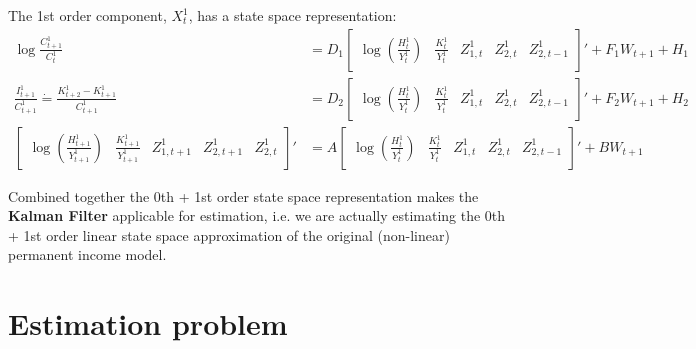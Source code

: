 \documentclass[12pt]{article}
\theoremstyle{definition}
\theoremstyle{remark}
\begin{document}
The 1st order component, $X_t^1$, has a state space representation:
\begin{align*}
    \log\frac{C_{t+1}^1}{C_{t}^1} &= D_1 \begin{bmatrix}\log\left(\frac{H_{t}^1}{Y_{t}^1}\right) & \frac{K_{t}^1}{Y_{t}^1} & Z_{1,t}^1 & Z_{2,t}^1 & Z_{2,t-1}^1 \end{bmatrix}' + F_1 W_{t+1} + H_1 \\
    \frac{I_{t+1}^1}{C_{t+1}^1}\dot{=}\frac{K_{t+2}^1-K_{t+1}^1}{C_{t+1}^1} &= D_2 \begin{bmatrix}\log\left(\frac{H_{t}^1}{Y_{t}^1}\right) & \frac{K_{t}^1}{Y_{t}^1} & Z_{1,t}^1 & Z_{2,t}^1 & Z_{2,t-1}^1 \end{bmatrix}'  + F_2 W_{t+1} + H_2  \\
    \begin{bmatrix}\log\left(\frac{H_{t+1}^1}{Y_{t+1}^1}\right) & \frac{K_{t+1}^1}{Y_{t+1}^1} & Z_{1,t+1} ^1& Z_{2,t+1}^1 & Z_{2,t}^1 \end{bmatrix}' &= A \begin{bmatrix}\log\left(\frac{H_{t}^1}{Y_{t}^1}\right) & \frac{K_{t}^1}{Y_{t}^1} & Z_{1,t}^1 & Z_{2,t}^1 & Z_{2,t-1}^1 \end{bmatrix}' + B W_{t+1}
\end{align*}

Combined together the 0th + 1st order state space representation makes the \textbf{Kalman Filter} applicable for estimation, i.e. we are actually estimating the 0th + 1st order linear state space approximation of the original (non-linear) permanent income model.

\section*{Estimation problem}
\end{document}
